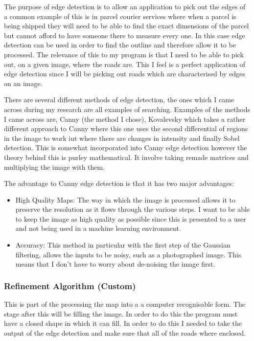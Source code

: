\begin{FlushLeft}
    The purpose of edge detection is to allow an application to pick out the edges of a common example of this is in parcel courier services where when a parcel is being shipped they will need to be able to find the exact dimensions of the parcel but cannot afford to have someone there to measure every one. In this case edge detection can be used in order to find the outline and therefore allow it to be processed. The relevance of this to my program is that I need to be able to pick out, on a given image, where the roads are. This I feel is a perfect application of edge detection since I will be picking out roads which are characterised by edges on an image. \\ \bk

    There are several different methods of edge detection, the ones which I came across during my research are all examples of searching. Examples of the methods I came across are, Canny (the method I chose), Kovalevsky which takes a rather different approach to Canny where this one uses the second differential of regions in the image to work iut where there are changes in intensity and finally Sobel detection. This is somewhat incorporated into Canny edge detection however the theory behind this is purley mathematical. It involve taking remade matrices and multiplying the image with them. \\ \bk

    The advantage to Canny edge detection is that it has two major advantages:
    \begin{itemize}
        \item High Quality Maps: The way in which the image is processed allows it to preserve the resolution as it flows through the various steps. I want to be able to keep the image as high quality as possible since this is presented to a user and not being used in a machine learning environment.
        \item Accuracy: This method in particular with the first step of the Gaussian filtering, allows the inputs to be noisy, such as a photographed image. This means that I don't have to worry about de-noising the image first. 
    \end{itemize}

    \bk

    \subsubsection{Refinement Algorithm (Custom)}
    This is part of the processing the map into a a computer recognisable form. The stage after this will be filling the image. In order to do this the program must have a closed shape in which it can fill. In order to do this I needed to take the output of the edge detection and make sure that all of the roads where enclosed. \\ \bk


\end{FlushLeft}
